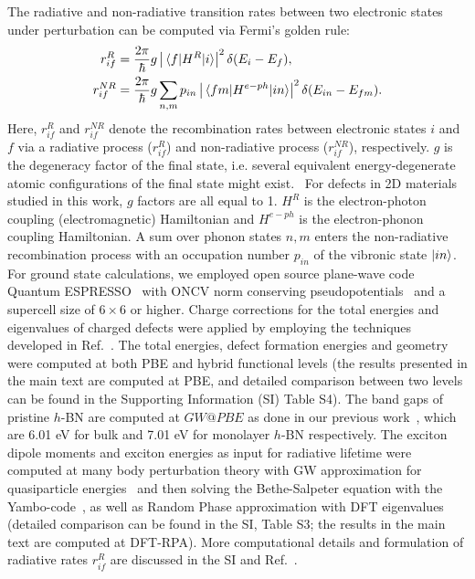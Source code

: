 The radiative and non-radiative transition rates between two electronic states under perturbation can be computed via Fermi's golden rule:
\begin{align}
    r_{if}^{R} &=  \frac{2\pi}{\hbar}g\left|\mel{f}{H^R}{i}\right|^2\delta(E_i-E_f),  \label{eq:rate-radiative-fg} \\
    r_{if}^{NR} &= \frac{2\pi}{\hbar}g\sum_{n,m}p_{in}\left|\mel{fm}{H^{e-ph}}{in}\right|^2\delta(E_{in}-E_{fm}). \label{eq:rate-nonradiative-fg}
\end{align}
Here, $r_{if}^R$ and $r_{if}^{NR}$ denote the recombination rates between electronic states $i$ and $f$ via a radiative process ($r_{if}^R$) and non-radiative process ($r_{if}^{NR}$), respectively. %
$g$ is the degeneracy factor of the final state, i.e. several equivalent energy-degenerate atomic configurations of the final state might exist.~\cite{alkauskas2014first2}
For defects in 2D materials studied in this work, $g$ factors are all equal to 1.
$H^R$ is the electron-photon coupling (electromagnetic) Hamiltonian and $H^{e-ph}$ is the electron-phonon coupling Hamiltonian. A sum over phonon states $n,m$ enters the non-radiative recombination process with an occupation number $p_{in}$ of the vibronic state $\ket{in}$. For ground state calculations, we employed open source plane-wave code Quantum ESPRESSO~\cite{QE1} with ONCV norm conserving pseudopotentials~\cite{ONCV1,ONCV2} and a supercell size of $6\times6$ or higher. Charge corrections for the total energies and eigenvalues of charged defects were applied by employing the techniques developed in Ref.~\cite{wu2017first,PING2017JCP}. The total energies, defect formation energies and geometry were computed at both PBE and hybrid functional levels (the results presented in the main text are computed at PBE, and detailed comparison between two levels can be found in the Supporting Information (SI) Table S4). The band gaps of pristine $h$-BN are computed at $GW@PBE$ as done in our previous work~\cite{wu2017first}, which are 6.01 eV for bulk and 7.01 eV for monolayer $h$-BN respectively.
The exciton dipole moments and exciton energies as input for radiative lifetime were computed at many body perturbation theory with GW approximation for quasiparticle energies~\cite{govoni2015large,ping20132electronic,nguyen2012improving} and then solving the Bethe-Salpeter equation with the Yambo-code~\cite{YAMBO}, as well as Random Phase approximation with DFT eigenvalues (detailed comparison can be found in the SI, Table S3; the results in the main text are computed at DFT-RPA). More computational details and formulation of radiative rates $r_{if}^R$ are discussed in the SI and Ref.~\cite{wu2019dimensionality}.

